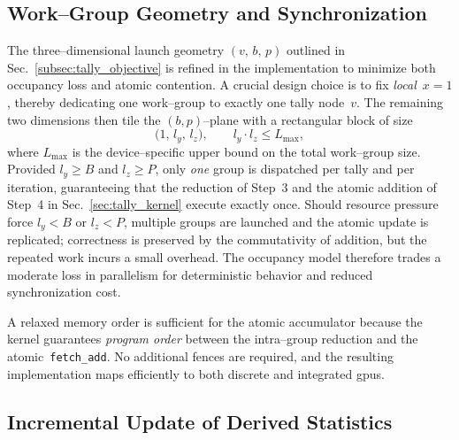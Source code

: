 
\subsection{Work--Group Geometry and Synchronization}
\label{subsec:tally_geometry}

The three--dimensional launch geometry \((v,\,b,\,p)\) outlined in
Sec.~\ref{subsec:tally_objective} is refined in the implementation to minimize
both occupancy loss and atomic contention.  A crucial design choice is to fix
\emph{local}~\(x=1\), thereby dedicating one work--group to exactly one tally
node~\(v\).  The remaining two dimensions then tile the \((b,p)\)--plane with a
rectangular block of size
\[
  \bigl(1,\,l_y,\,l_z\bigr),
  \qquad l_y\cdot l_z\le L_{\max},
\]
where \(L_{\max}\) is the device--specific upper bound on the total work--group
size.  Provided \(l_y\!\ge\!B\) and \(l_z\!\ge\!P\), only \emph{one} group is
dispatched per tally and per iteration, guaranteeing that the reduction of
Step~3 and the atomic addition of Step~4 in
Sec.~\ref{sec:tally_kernel} execute exactly once.  Should resource pressure
force \(l_y< B\) or \(l_z< P\), multiple groups are launched and the atomic
update is replicated; correctness is preserved by the commutativity of
addition, but the repeated work incurs a small overhead.  The occupancy model
therefore trades a moderate loss in parallelism for deterministic behavior and
reduced synchronization cost.

A relaxed memory order is sufficient for the atomic accumulator because the
kernel guarantees \emph{program order} between the intra--group reduction and
the atomic~\texttt{fetch\_add}.  No additional fences are required, and the
resulting implementation maps efficiently to both discrete and integrated
\acrshort{gpu}s.

\subsection{Incremental Update of Derived Statistics}
\label{subsec:tally_stats_refresh}

